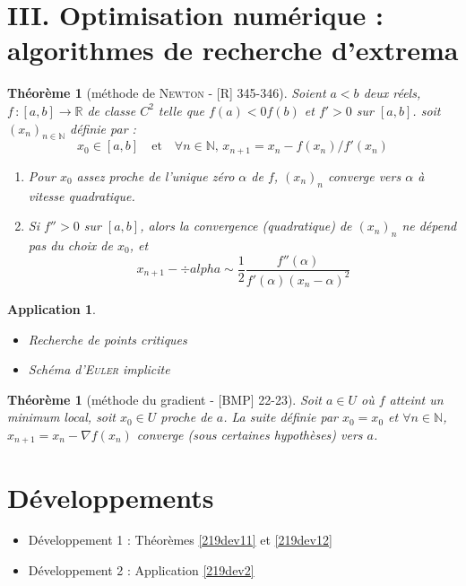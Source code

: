 \documentclass[10pt, a4paper, parskip=full, twoside, twocolumn]{report}
\newtheorem{theorem}[definition]{Théorème}
\newtheorem{application}[definition]{Application}
\newcommand{\IN}{\mathbb{N}}
\newcommand{\IR}{\mathbb{R}}
\begin{document}
\section*{III. Optimisation numérique : algorithmes de recherche d'extrema}
\begin{theorem}[méthode de \textsc{Newton} - \textnormal{[R] 345-346}]
	Soient $a < b$ deux réels, $f\,\colon[a,b]\to \IR$ de classe $C^2$ telle que $f(a)< 0 f(b)$ et $f'>0$ sur $[a,b]$.
	soit $\left(x_n\right)_{n\in\IN}$ définie par :
	$$x_0\in [a,b]\quad\text{et}\quad \forall n\in\IN,\, x_{n+1} = x_n - f(x_n)/f'(x_n)$$
	\begin{enumerate}
		\item Pour $x_0$ assez proche de l'unique zéro $\alpha$ de $f$, $\left(x_n\right)_n$ converge vers $\alpha$ à vitesse quadratique.
		\item Si $f''>0$ sur $[a,b]$, alors la convergence (quadratique) de $\left(x_n\right)_n$ ne dépend pas du choix de $x_0$, et $$x_{n+1} - ÷alpha \sim \frac{1}{2}\frac{f''(\alpha)}{f'(\alpha)(x_n-\alpha)^2}$$
	\end{enumerate}
\end{theorem}

\begin{application}
	\begin{itemize}
		\item Recherche de points critiques
		\item Schéma d'\textsc{Euler} implicite
	\end{itemize}
\end{application}

\begin{theorem}[méthode du gradient - \textnormal{[BMP] 22-23}]
	Soit $a\in U$ où $f$ atteint un minimum local, soit $x_0\in U$ proche de $a$.
	La suite définie par $x_0 = x_0$ et $\forall n\in \IN$, $x_{n+1} = x_n - \nabla f(x_n)$ converge (sous certaines hypothèses) vers $a$.
\end{theorem}

\section*{Développements}
\begin{itemize}
	\item Développement 1 : Théorèmes \ref{219dev11} et \ref{219dev12}
	\item Développement 2 : Application \ref{219dev2}
\end{itemize}
\end{document}
